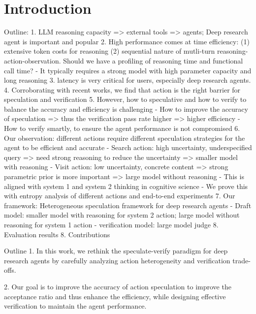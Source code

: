 
\section{Introduction}

\iffalse
Outline: 
1. LLM reasoning capacity => external tools => agents; Deep research agent is important and popular
2. High performance comes at time efficiency: (1) extensive token costs for reasoning (2) sequential nature of 
mutli-turn reasoning-action-observation. Should we have a profiling of reasoning time and functional call time?
    - It typically requires a strong model with high parameter capacity and long reasoning 
3. latency is very critical for users, especially deep research agents. 
4. Corroborating with recent works, we find that action is the right barrier for speculation and verification 
5. However, how to speculative and how to verify to balance the accuracy and efficiency is challenging 
   - How to improve the accuracy of speculation => thus the verification pass rate higher => higher efficiency
   - How to verify smartly, to ensure the agent performance is not compromised 
6. Our observation: different actions require different speculation strategies for the agent to be efficient and accurate
   - Search action: high uncertainty, underspecified query => need strong reasoning to reduce the uncertainty => smaller model with reasoning 
   - Visit action: low uncertainty, concrete content => strong parametric prior is more important => large model without reasoning 
   - This is aligned with system 1 and system 2 thinking in cognitive science 
   - We prove this with entropy analysis of different actions and end-to-end experiments
7. Our framework: Heterogeneous speculation framework for deep research agents 
   - Draft model: smaller model with reasoning for system 2 action; large model without reasoning for system 1 action
   - verification model: large model judge
8. Evaluation results
8. Contributions

Outline
1. In this work, we rethink the speculate-verify paradigm for deep research agents by carefully analyzing action heterogeneity and verification trade-offs.

2. Our goal is to improve the accuracy of action speculation to improve the acceptance ratio and thus enhance the efficiency, while designing effective verification to maintain the agent performance.

